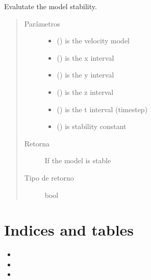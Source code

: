 \documentclass[letterpaper,10pt,brazil]{sphinxmanual}
\begin{document}

\begin{fulllineitems}
\label{\detokenize{source/stability:stability.stability}}
Evalutate the model stability.
\begin{quote}\begin{description}
\item[{Parâmetros}] \leavevmode\begin{itemize}
\item {} 
 () \textendash{} is the velocity model

\item {} 
 () \textendash{} is the x interval

\item {} 
 () \textendash{} is the y interval

\item {} 
 () \textendash{} is the z interval

\item {} 
 () \textendash{} is the t interval (timestep)

\item {} 
 () \textendash{} is stability constant

\end{itemize}

\item[{Retorna}] \leavevmode
If the model is stable

\item[{Tipo de retorno}] \leavevmode
bool

\end{description}\end{quote}

\end{fulllineitems}



\chapter{Indices and tables}
\label{\detokenize{index:indices-and-tables}}\begin{itemize}
\item {} 

\item {} 

\item {} 

\end{itemize}
\end{document}

